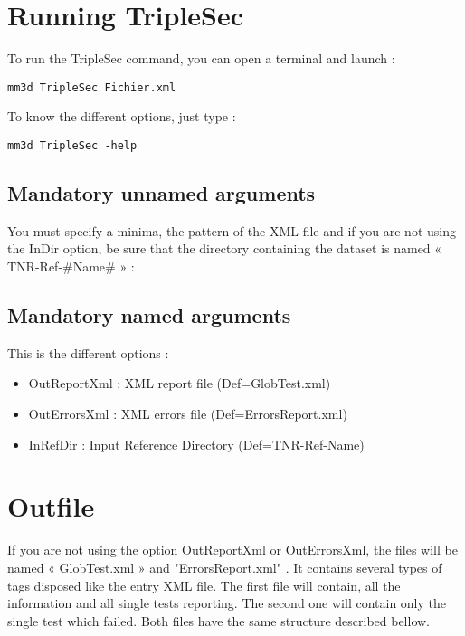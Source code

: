 \documentclass[a4paper]{book}
\begin{document}
\section{Running TripleSec}
To run the TripleSec command, you can open a terminal and launch :
\begin{verbatim}
mm3d TripleSec Fichier.xml
\end{verbatim}
To know the different options, just type :
\begin{verbatim}
mm3d TripleSec -help
\end{verbatim}

\subsection{Mandatory unnamed arguments}
You must specify a minima, the pattern of the XML file and if you are not using the InDir option, be sure that the directory containing the dataset is named « TNR-Ref-\#Name\# » :

\subsection{Mandatory named arguments}
This is the different options :
\begin{itemize}
\item OutReportXml : XML report file (Def=GlobTest.xml)
\item OutErrorsXml : XML errors file (Def=ErrorsReport.xml)
\item InRefDir : Input Reference Directory (Def=TNR-Ref-Name)
\end{itemize}

\section{Outfile}
If you are not using the option OutReportXml or OutErrorsXml, the files will be named « GlobTest.xml » and "ErrorsReport.xml" . It contains several types of tags disposed like the entry XML file. The first file will contain, all the information and all single tests reporting. The second one will contain only the single test which failed. Both files have the same structure described bellow.
\end{document}

